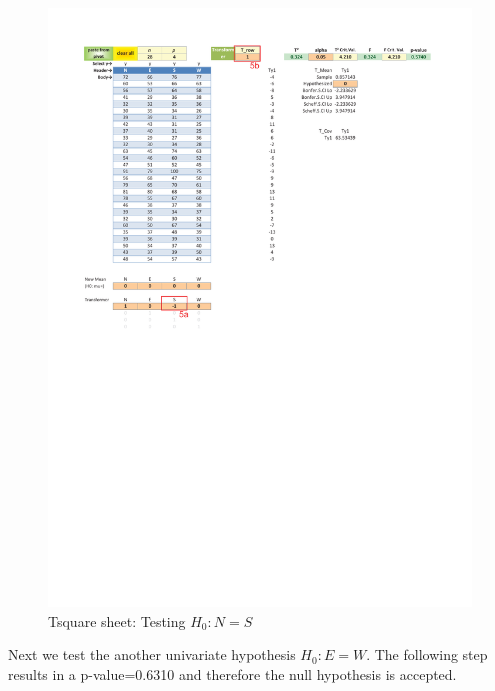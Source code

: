 \documentclass[article]{jss}
\begin{document}
\begin{enumerate}
                \begin{figure}[!tbh]
                        \includegraphics[width=\linewidth,keepaspectratio=true]{img/TsquareSheetOutput_markup}
                        \centering\protect\caption{Tsquare sheet: Testing $H_0: N = S$}
                \end{figure}
                
                
                
                Next we test the another univariate hypothesis $H_0: E = W$. The following step results in a p-value=0.6310 and therefore the null hypothesis is accepted.
                

\end{enumerate}
\end{document}
